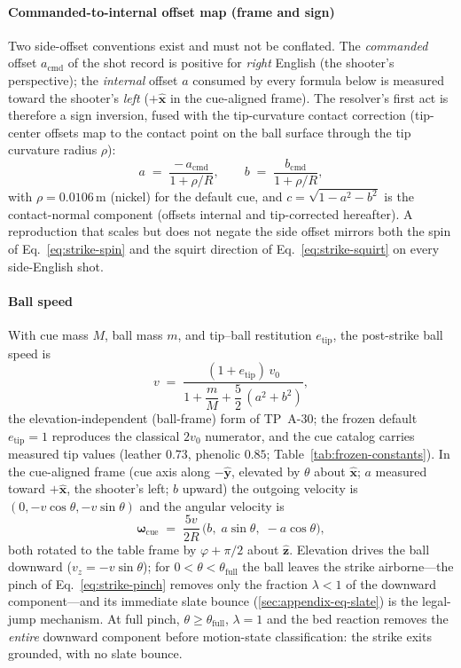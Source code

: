 \paragraph{Commanded-to-internal offset map (frame and sign)} Two
side-offset conventions exist and must not be conflated. The
\emph{commanded} offset $a_{\mathrm{cmd}}$ of the shot record is
positive for \emph{right} English (the shooter's perspective); the
\emph{internal} offset $a$ consumed by every formula below is measured
toward the shooter's \emph{left} ($+\hat{\mathbf{x}}$ in the
cue-aligned frame). The resolver's first act is therefore a sign
inversion, fused with the tip-curvature contact correction (tip-center
offsets map to the contact point on the ball surface through the tip
curvature radius $\rho$):
\begin{equation}
a \;=\; \frac{-\,a_{\mathrm{cmd}}}{1 + \rho/R},
\qquad
b \;=\; \frac{b_{\mathrm{cmd}}}{1 + \rho/R},
\label{eq:strike-tipscale}
\end{equation}
with $\rho = 0.0106$\,m (nickel) for the default cue, and
$c = \sqrt{1 - a^{2} - b^{2}}$ is the contact-normal component
(offsets internal and tip-corrected hereafter). A reproduction that
scales but does not negate the side offset mirrors both the spin of
Eq.~\eqref{eq:strike-spin} and the squirt direction of
Eq.~\eqref{eq:strike-squirt} on every side-English shot.

\paragraph{Ball speed} With cue mass $M$, ball mass $m$, and tip--ball
restitution $e_{\mathrm{tip}}$, the post-strike ball speed is
\begin{equation}
v \;=\; \frac{(1 + e_{\mathrm{tip}})\,v_0}
{1 + \dfrac{m}{M} + \dfrac{5}{2}\,(a^{2} + b^{2})},
\label{eq:strike-speed}
\end{equation}
the elevation-independent (ball-frame) form of TP~A-30; the frozen
default $e_{\mathrm{tip}} = 1$ reproduces the classical $2v_0$
numerator, and the cue catalog carries measured tip values (leather
$0.73$, phenolic $0.85$; Table~\ref{tab:frozen-constants}). In the
cue-aligned frame (cue axis along $-\hat{\mathbf{y}}$, elevated by
$\theta$ about $\hat{\mathbf{x}}$; $a$ measured toward
$+\hat{\mathbf{x}}$, the shooter's left; $b$ upward) the outgoing
velocity is $(0, -v\cos\theta, -v\sin\theta)$ and the angular velocity
is
\begin{equation}
\boldsymbol{\omega}_{\mathrm{cue}} \;=\; \frac{5v}{2R}\,
\bigl(b,\; a\sin\theta,\; -a\cos\theta\bigr),
\label{eq:strike-spin}
\end{equation}
both rotated to the table frame by $\varphi + \pi/2$ about
$\hat{\mathbf{z}}$. Elevation drives the ball downward
($v_z = -v\sin\theta$); for $0 < \theta < \theta_{\mathrm{full}}$ the
ball leaves the strike airborne---the pinch of
Eq.~\eqref{eq:strike-pinch} removes only the fraction $\lambda < 1$ of
the downward component---and its immediate slate bounce
(\ref{sec:appendix-eq-slate}) is the legal-jump mechanism. At full
pinch, $\theta \ge \theta_{\mathrm{full}}$, $\lambda = 1$ and the bed
reaction removes the \emph{entire} downward component before
motion-state classification: the strike exits grounded, with no slate
bounce.

